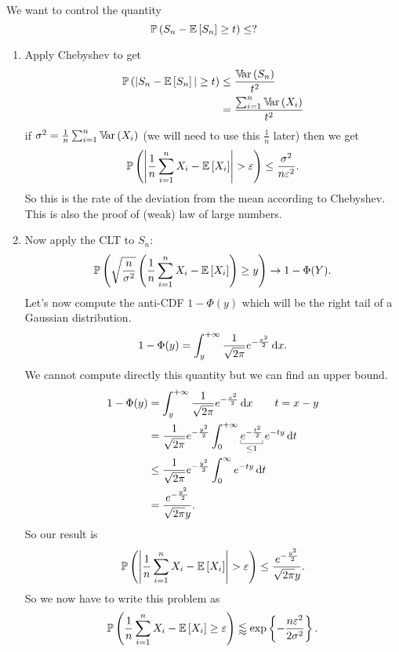 \documentclass[12pt]{report}
\begin{document}
We want to control the quantity
\begin{equation*}
	\mathbb{P}\left(S_{n}-\mathbb{E}\left[S_{n}\right]\geq t\right)\leq ?
\end{equation*}
\begin{enumerate}
	\item Apply Chebyshev to get
	\begin{align*}
		\mathbb{P}\left(|S_{n}-\mathbb{E}\left[S_{n}\right]|\geq t\right)&\leq\frac{\mathbb{V}\!\mathrm{ar}\,(S_{n})}{t^{2}}\\
		&=\frac{\sum_{i=1}^{n}\mathbb{V}\!\mathrm{ar}\,(X_{i})}{t^{2}}
	\end{align*}
	if $\sigma^{2}=\frac{1}{n}\sum_{i=1}^{n}\mathbb{V}\!\mathrm{ar}\,(X_{i})$ (we will need to use this $\frac{1}{n}$ later) then we get
	\begin{equation*}
		\pr\left(\left|\frac{1}{n}\sum_{i=1}^{n}X_{i}-\ev{X_{i}}\right|>\varepsilon\right)\leq\frac{\sigma^{2}}{n\varepsilon^{2}}.
	\end{equation*}
	So this is the rate of the deviation from the mean according to Chebyshev.	This is also the proof of (weak) law of large numbers.
	\item Now apply the CLT to $S_{n}$:
	\begin{align*}
		\mathbb{P}\left(\sqrt{\frac{n}{\sigma^{2}}}\left(\frac{1}{n}\sum_{i=1}^{n}X_{i}-\mathbb{E}\left[X_{i}\right]\right)\geq y\right)\to 1-\Phi(Y).
	\end{align*}
	Let's now compute the anti-CDF $1-\Phi(y)$ which will be the right tail of a Gaussian distribution.
	\begin{equation*}
		1-\Phi(y)=\int_{y}^{+\infty}\frac{1}{\sqrt{2\pi}}e^{-\frac{x^{2}}{2}}\mathop{}\!\mathrm{d} x.
	\end{equation*}
	We cannot compute directly this quantity but we can find an upper bound.
	\begin{align*}
		1-\Phi(y)&=\int_{y}^{+\infty}\frac{1}{\sqrt{2\pi}}e^{-\frac{x^{2}}{2}}\dx\qquad t=x-y\\
		&=\frac{1}{\sqrt{2\pi}}e^{-\frac{y^{2}}{2}}\int_{0}^{+\infty}\ubracketthin{e^{-\frac{t^{2}}{2}}}_{\leq1}e^{-ty}\dt\\
			&\leq\frac{1}{\sqrt{2\pi}}e^{-\frac{y^{2}}{2}}\int_{0}^{\infty}e^{-ty}\dt\\
			&=\frac{e^{-\frac{y^{2}}{2}}}{\sqrt{2\pi}y}.
	\end{align*}
	So our result is
	\begin{equation*}
			\pr\left(\left|\frac{1}{n}\sum_{i=1}^{n}X_{i}-\ev{X_{i}}\right|>\varepsilon\right)\leq\frac{e^{-\frac{y^{2}}{2}}}{\sqrt{2\pi}y}.
	\end{equation*}
	So we now have to write this problem as
	\begin{equation*}
		\mathbb{P}\left(\frac{1}{n}\sum_{i=1}^{n}X_{i}-\mathbb{E}\left[X_{i}\right]\geq\varepsilon\right)\lessapprox\exp\left\{-\frac{n\varepsilon^{2}}{2\sigma^{2}}\right\}.
	\end{equation*}
\end{enumerate}
\end{document}
